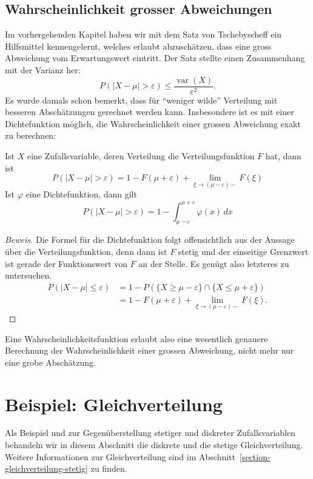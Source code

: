 \subsection{Wahrscheinlichkeit grosser Abweichungen}
Im vorhergehenden Kapitel haben wir mit dem Satz von Tschebyscheff ein
Hilfsmittel kennengelernt, welches erlaubt abzuschätzen, dass eine
gross Abweichung vom Erwartungswert eintritt.
Der Satz stellte einen
Zusammenhang mit der Varianz her:
\[
P(|X-\mu|>\varepsilon)\le\frac{\operatorname{var}(X)}{\varepsilon^2}.
\]
Es wurde damals schon bemerkt, dass für ``weniger wilde'' Verteilung mit
besseren Abschätzungen gerechnet werden kann.
Insbesondere ist es mit
einer Dichtefunktion möglich, die Wahrscheinlichkeit einer grossen
Abweichung exakt zu berechnen:
\begin{satz} Ist $X$ eine Zufallsvariable, deren Verteilung die
Verteilungsfunktion $F$ hat, dann ist
\[
P(|X-\mu|>\varepsilon)=
1-F(\mu+\varepsilon)+\lim_{\xi\to (\mu-\varepsilon)-}F(\xi)
\]
Ist $\varphi$ eine Dichtefunktion, dann gilt
\[
P(|X-\mu|>\varepsilon)=1-\int_{\mu-\varepsilon}^{\mu+\varepsilon}\varphi(x)\,dx
\]
\end{satz}
\begin{proof}[Beweis]Die Formel für die Dichtefunktion folgt offensichtlich
aus der Aussage über die Verteilungsfunktion, denn dann ist $F$ stetig
und der einseitige Grenzwert ist gerade der Funktionswert von $F$ an der
Stelle.
Es genügt also letzteres
zu untersuchen.
\begin{align*}
P(|X-\mu|\le\varepsilon)
&=1-P(\{X\ge\mu-\varepsilon\}\cap\{X\le\mu+\varepsilon\})\\
&=1-F(\mu+\varepsilon)+\lim_{\xi\to (\mu-\varepsilon)-}F(\xi).
\end{align*}
\end{proof}
Eine Wahrscheinlichkeitsfunktion erlaubt also eine wesentlich
genauere Berechnung der Wahrscheinlichkeit einer grossen Abweichung,
nicht mehr nur eine grobe Abschätzung.

\section{Beispiel: Gleichverteilung}
Als Beispiel und zur Gegenüberstellung stetiger und diskreter Zufallsvariablen
behandeln wir in diesem Abschnitt die diskrete und die stetige
Gleichverteilung.
Weitere Informationen zur Gleichverteilung sind
im Abschnitt~\ref{section-gleichverteilung-stetig} zu finden.

